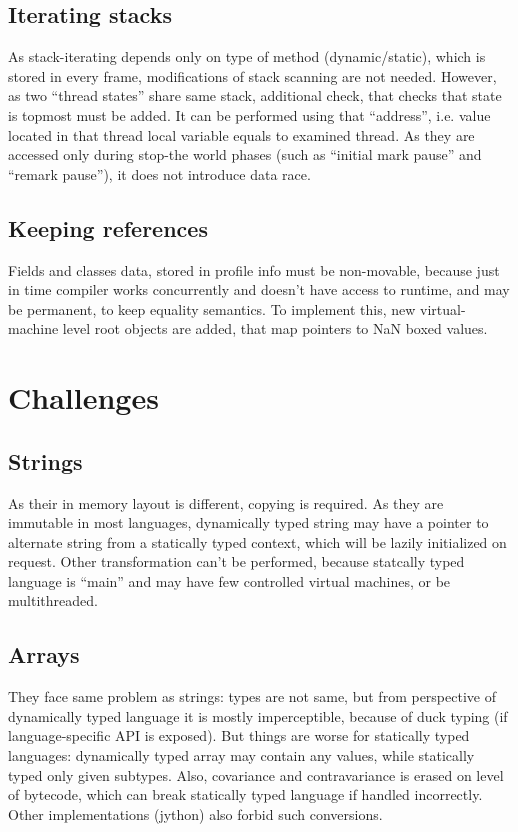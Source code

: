 \documentclass[times, %
	specification,annotation, %
	titlepage-extra-ru,specification-extra-ru,annotation-extra-ru, %
	languages={russian,english} %
	]{itmo-student-thesis}
\begin{document}
\subsection{Iterating stacks}
As stack-iterating depends only on type of method (dynamic/static), which is stored in every frame, modifications of stack scanning are not needed. However, as two ``thread states'' share same stack, additional check, that checks that state is topmost must be added. It can be performed using that ``address'', i.e. value located in that thread local variable equals to examined thread. As they are accessed only during stop-the world phases (such as ``initial mark pause'' and ``remark pause''), it does not introduce data race.
\subsection{Keeping references}
Fields and classes data, stored in profile info must be non-movable, because just in time compiler works concurrently and doesn't have access to runtime, and may be permanent, to keep equality semantics. To implement this, new virtual-machine level root objects are added, that map pointers to NaN boxed values.

\section{Challenges}
\subsection{Strings}
As their in memory layout is different, copying is required. As they are immutable in most languages, dynamically typed string may have a pointer to alternate string from a statically typed context, which will be lazily initialized on request. Other transformation can't be performed, because statcally typed language is ``main'' and may have few controlled virtual machines, or be multithreaded.
\subsection{Arrays}
They face same problem as strings: types are not same, but from perspective of dynamically typed language it is mostly imperceptible, because of duck typing (if language-specific API is exposed). But things are worse for statically typed languages: dynamically typed array may contain any values, while statically typed only given subtypes. Also, covariance and contravariance is erased on level of bytecode, which can break statically typed language if handled incorrectly. Other implementations (jython) also forbid such conversions.
\end{document}
